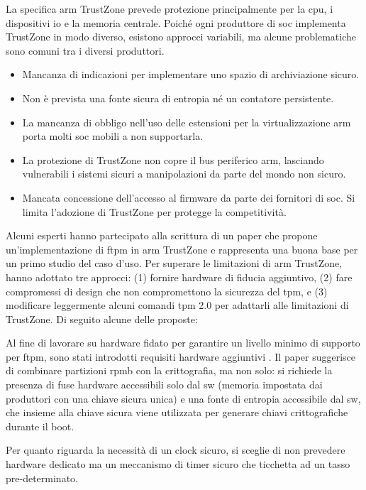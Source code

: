 La specifica \acrshort{arm} TrustZone prevede protezione principalmente per la \acrshort{cpu}, i dispositivi \acrshort{io} e la memoria centrale. Poiché ogni produttore di \acrshort{soc} implementa TrustZone in modo diverso, esistono approcci variabili, ma alcune problematiche sono comuni tra i diversi produttori.

\begin{itemize}
    \item Mancanza di indicazioni per implementare uno spazio di archiviazione sicuro.
    \item Non è prevista una fonte sicura di entropia né un contatore persistente.
    \item La mancanza di obbligo nell'uso delle estensioni per la virtualizzazione \acrshort{arm} porta molti \acrshort{soc} mobili a non supportarla.
    \item La protezione di TrustZone non copre il bus periferico \acrshort{arm}, lasciando vulnerabili i sistemi sicuri a manipolazioni da parte del mondo non sicuro.
    \item Mancata concessione dell'accesso al firmware da parte dei fornitori di \acrshort{soc}. Si limita l'adozione di TrustZone per protegge la competitività.
\end{itemize}

Alcuni esperti hanno partecipato alla scrittura di un paper che propone un’implementazione di \acrshort{ftpm} in \acrshort{arm} TrustZone e rappresenta una buona base per un primo studio del caso d’uso. Per superare le limitazioni di \acrshort{arm} TrustZone, hanno adottato tre approcci: (1) fornire hardware di fiducia aggiuntivo, (2) fare compromessi di design che non compromettono la sicurezza del \acrshort{tpm}, e (3) modificare leggermente alcuni comandi \acrshort{tpm} 2.0 per adattarli alle limitazioni di TrustZone. Di seguito alcune delle proposte:

Al fine di lavorare su hardware fidato per garantire un livello minimo di supporto per \acrshort{ftpm}, sono stati introdotti requisiti hardware aggiuntivi . Il paper suggerisce di combinare partizioni \acrshort{rpmb} con la crittografia, ma non solo: si richiede la presenza di fuse hardware accessibili solo dal \acrshort{sw} (memoria impostata dai produttori con una chiave sicura unica) e una fonte di entropia accessibile dal \acrshort{sw}, che insieme alla chiave sicura viene utilizzata per generare chiavi crittografiche durante il boot. 

Per quanto riguarda la necessità di un clock sicuro, si sceglie di non prevedere hardware dedicato ma un meccanismo di timer sicuro che ticchetta ad un tasso pre-determinato.

